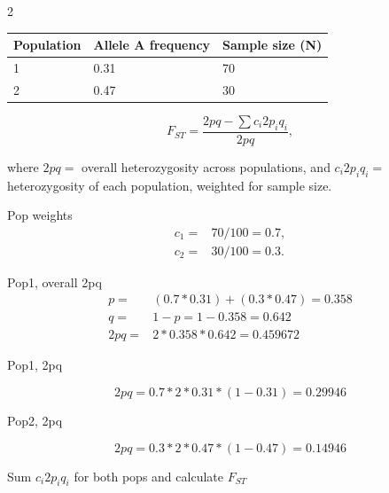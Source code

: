 \documentclass[12pt, addpoints]{exam}
\newenvironment{AnswerPage}[1]
{\begin{minipage}[t][#1]{0.92\textwidth}%
		\begin{solution}}
		{\end{solution}\end{minipage}
	\vspace{\stretch{1}}}
\begin{document}
\begin{questions}
\begin{multicols}{2}
\begin{tabular}{lR{2cm}R{2cm}}
\toprule
Population & Allele A frequency & Sample size (N) \tabularnewline
{} & 0.31 & 70  & 0.47 & 30 \tabularnewline
\bottomrule
\end{tabular}

\columnbreak

$$F_{ST} = \frac{2pq - \sum c_i2p_iq_i}{2pq},$$

where $2pq =$ overall heterozygosity across populations, and $c_i2p_iq_i =$ heterozygosity of each population, weighted for sample size.

\end{multicols}


\begin{AnswerPage}{0.5\textheight}

Pop weights
\begin{align*}
c_1 =& 70/100 = 0.7, \\
%
c_2 =& 30/100 = 0.3.
%
\end{align*}

Pop1, overall 2pq
\begin{align*}
p =& (0.7*0.31) + (0.3 * 0.47) =  0.358\\
%
q =& 1 - p = 1 - 0.358 = 0.642\\
%
2pq =& 2 * 0.358 * 0.642 = 0.459672
\end{align*}
%


Pop1, 2pq

$$2pq = 0.7*2*0.31*(1-0.31) = 0.29946$$

Pop2, 2pq

$$2pq = 0.3*2 * 0.47*(1-0.47) = 0.14946$$

Sum $c_i2p_iq_i$ for both pops and calculate $F_{ST}$


\end{AnswerPage}
\end{questions}
\end{document}
